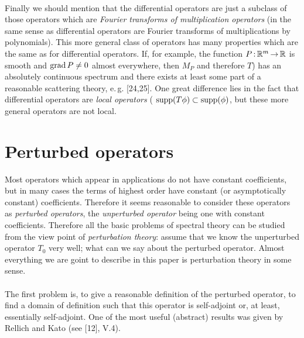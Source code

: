 \documentclass[11pt,twoside]{article}
\begin{document}
\paragraph*{}
Finally we should mention that the differential operators are just
a subclass of those operators
which are \textit{Fourier transforms of multiplication operators}
(in the same sense as differential operators are Fourier transforms
of multiplications by polynomials).
This more general class of operators has many properties
which are the same as for differential operators.
If, for example,
the function $P {\,:\,} {\mathbb{R}}^m {\,\to\,} {\mathbb{R}}$ is smooth and $\operatorname{grad} P \neq 0$
almost everywhere,
then $M_P$ and therefore $T$) has an absolutely continuous spectrum
and there exists at least some part of a reasonable scattering theory,
e.\,g. [24,25].
One great difference lies in the fact
that differential operators are \textit{local operators}
({\ie} $\operatorname{supp}(T \phi) \subset \operatorname{supp}(\phi)$,
but these more general operators are not local.

\section{Perturbed operators}                                                  %
Most operators which appear in applications do not have constant coefficients,
but in many cases the terms of highest order have constant
(or asymptotically constant) coefficients.
Therefore it seems reasonable to consider these operators as
\textit{perturbed operators},
the \textit{unperturbed operator} being one with constant coefficients.
Therefore all the basic problems of spectral theory can be studied
from the view point of \textit{perturbation theory}:
assume that we know the unperturbed operator $T_0$ very well;
what can we say about the perturbed operator.
Almost everything we are goint to describe in this paper is
perturbation theory in some sense.

\paragraph*{}
The first problem is,
to give a reasonable definition of the perturbed operator,
{\ie} to find a domain of definition such that
this operator is self-adjoint or, at least, essentially self-adjoint.
One of the most useful (abstract) results was given by Rellich and Kato
(see [12], V.4).
\end{document}
